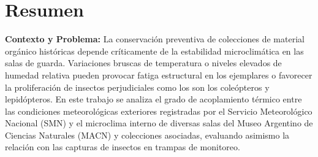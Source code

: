 \documentclass[11pt,a4paper]{article}
\begin{document}


\fecha{\today}



\maketitle

\newpage
{} %

\section{Resumen}

\textbf{Contexto y Problema:} La conservación preventiva de colecciones de material orgánico históricas depende críticamente de la estabilidad microclimática en las salas de guarda. Variaciones bruscas de temperatura o niveles elevados de humedad relativa pueden provocar fatiga estructural en los ejemplares o favorecer la proliferación de insectos perjudiciales como los son los coleópteros y lepidópteros. En este trabajo se analiza el grado de acoplamiento térmico entre las condiciones meteorológicas exteriores registradas por el Servicio Meteorológico Nacional (SMN) y el microclima interno de diversas salas del Museo Argentino de Ciencias Naturales (MACN) y colecciones asociadas, evaluando asimismo la relación con las capturas de insectos en trampas de monitoreo.
\end{document}
